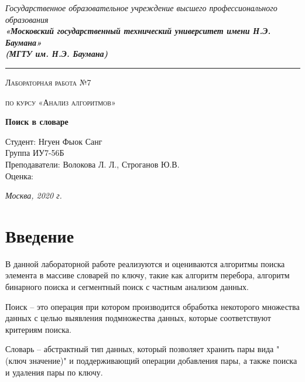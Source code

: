 \documentclass[12pt,a4paper]{report}
\begin{document}
	
\begin{titlepage}
	
	\begin{center}
		\Large
		{\sl Государственное образовательное учреждение высшего профессионального образования\\
			{\bf«Московский государственный технический университет имени Н.Э. Баумана»\\
				(МГТУ им. Н.Э. Баумана)}}
		\noindent\rule{\textwidth}{2pt}
		\vspace{3cm}
		
		{\scshape\LARGE Лабораторная работа №7 \par}
		\vspace{0.5cm}	
		{\scshape\LARGE по курсу «Анализ алгоритмов» \par}
		\vspace{1.5cm}
		{\huge\bfseries Поиск в словаре \par}
		\vspace{2cm}
		
		\begin{flushleft}
			\Large Студент: Нгуен Фыок Санг\\
			\Large Группа ИУ7-56Б\\
			Преподаватели:  Волокова Л. Л., Строганов Ю.В.\\
			Оценка:
		\end{flushleft}
		
		\vfill
		\Large \textit {Москва, 2020 г.}
		
	\end{center}
	
\end{titlepage}


\tableofcontents

\newpage
\chapter*{Введение}

В данной лабораторной работе реализуются и оцениваются алгоритмы поиска элемента в массиве словарей по ключу,
такие как алгоритм перебора, алгоритм бинарного поиска и сегментный поиск с частным анализом данных.

Поиск -- это операция при котором производится обработка некоторого множества данных с целью выявления 
подмножества данных, которые соответствуют критериям поиска. 

Словарь -- абстрактный тип данных, который позволяет хранить пары вида "(ключ значение)" и поддерживающий операции 
добавления пары, а также поиска и удаления пары по ключу. 
\end{document}
